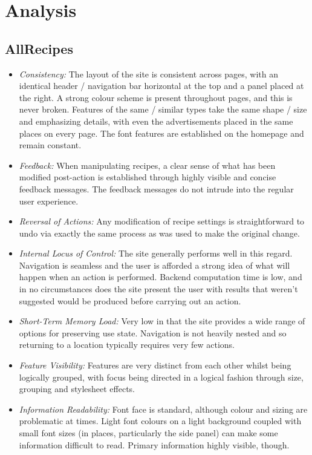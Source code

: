 \documentclass{article}
\begin{document}
\clearpage

\section*{Analysis}

\subsection*{AllRecipes}
\begin{itemize}
\item \emph{Consistency:} The layout of the site is consistent across pages, with an identical header / navigation bar horizontal at the top and a panel placed at the right. A strong colour scheme is present throughout pages, and this is never broken. Features of the same / similar types take the same shape / size and emphasizing details, with even the advertisements placed in the same places on every page. The font features are established on the homepage and remain constant.
\item \emph{Feedback:} When manipulating recipes, a clear sense of what has been modified post-action is established through highly visible and concise feedback messages. The feedback messages do not intrude into the regular user experience.
\item \emph{Reversal of Actions:} Any modification of recipe settings is straightforward to undo via exactly the same process as was used to make the original change.
\item \emph{Internal Locus of Control: }The site generally performs well in this regard. Navigation is seamless and the user is afforded a strong idea of what will happen when an action is performed. Backend computation time is low, and in no circumstances does the site present the user with results that weren't suggested would be produced before carrying out an action.
\item \emph{Short-Term Memory Load:} Very low in that the site provides a wide range of options for preserving use state. Navigation is not heavily nested and so returning to a location typically requires very few actions.
\item \emph{Feature Visibility:} Features are very distinct from each other whilst being logically grouped, with focus being directed in a logical fashion through size, grouping and stylesheet effects.
\item \emph{Information Readability:} Font face is standard, although colour and sizing are problematic at times. Light font colours on a light background coupled with small font sizes (in places, particularly the side panel) can make some information difficult to read. Primary information highly visible, though.
\end{itemize}
\end{document}
